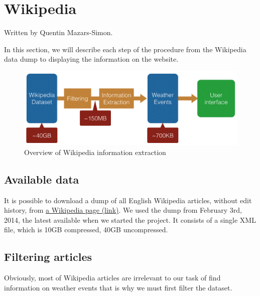 

%
\section{Wikipedia}
Written by Quentin Mazars-Simon.

In this section, we will describe each step of the procedure from the Wikipedia data dump to displaying the information on the website.
\begin{figure}[H]
    \includegraphics[width=\textwidth]{figures/wiki-flow.png}
    \caption{Overview of Wikipedia information extraction}
     \label{fig:wikiflow}
\end{figure}
\subsection{Available data}
It is possible to download a dump of all English Wikipedia articles, without edit history, from \href{https://meta.wikimedia.org/wiki/Data_dump_torrents#enwiki}{a Wikipedia page (link)}. We used the dump from February 3rd, 2014, the latest available when we started the project. It consists of a single XML file, which is 10GB compressed, 40GB uncompressed. 
\subsection{Filtering articles}
Obviously, most of Wikipedia articles are irrelevant to our task of find information on weather events that is why we must first filter the dataset. 
